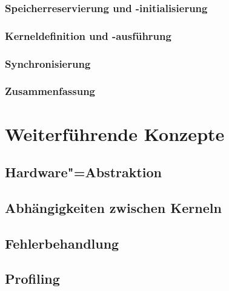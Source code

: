 \subsubsection{Speicherreservierung und -initialisierung}
\label{alpaka:ueberblick:axpy:buffer}

\subsubsection{Kerneldefinition und -ausführung}
\label{alpaka:ueberblick:axpy:kernel}

\subsubsection{Synchronisierung}
\label{alpaka:ueberblick:axpy:sync}

\subsubsection{Zusammenfassung}
\label{alpaka:ueberblick:axpy:zusammenfassung}

\section{Weiterführende Konzepte}\label{alpaka:konzepte}

\subsection{Hardware"=Abstraktion}

\subsection{Abhängigkeiten zwischen Kerneln}
\label{alpaka:konzepte:abhaengigkeiten}

\subsection{Fehlerbehandlung}

\subsection{Profiling}
